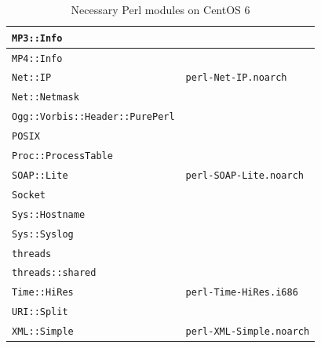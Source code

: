 \documentclass[a4paper,oneside,10pt]{report}
\begin{document}
\begin{table}
\begin{tabular}{|p{15em}|p{18em}|}
		\hline
		\verb|MP3::Info| 											& \\
		\hline
		\verb|MP4::Info| 											& \\
		\hline
		\verb|Net::IP| 												& \verb|perl-Net-IP.noarch| \\
		\hline
		\verb|Net::Netmask| 									& \\
		\hline
		\verb|Ogg::Vorbis::Header::PurePerl| 	& \\
		\hline
		\verb|POSIX| 													& \\
		\hline
		\verb|Proc::ProcessTable| 						& \\
		\hline
		\verb|SOAP::Lite| 										& \verb|perl-SOAP-Lite.noarch| \\
		\hline
		\verb|Socket| 												& \\
		\hline
		\verb|Sys::Hostname| 									& \\
		\hline
		\verb|Sys::Syslog| 										& \\
		\hline
		\verb|threads| 												& \\
		\hline
		\verb|threads::shared| 								& \\
		\hline
		\verb|Time::HiRes|										& \verb|perl-Time-HiRes.i686| \\
		\hline
		\verb|URI::Split| 										& \\
		\hline
		\verb|XML::Simple| 										& \verb|perl-XML-Simple.noarch| \\
		\hline
	\end{tabular}
	\caption{Necessary Perl modules on CentOS 6}
	\label{tab:NecessaryPerlModulesCentOS6}
\end{table}
\end{document}
